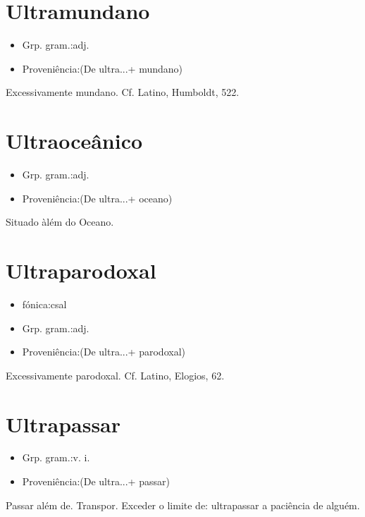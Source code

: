 \documentclass{article}
\begin{document}
\section{Ultramundano}
\begin{itemize}
\item {Grp. gram.:adj.}
\end{itemize}
\begin{itemize}
\item {Proveniência:(De \textunderscore ultra...\textunderscore  + \textunderscore mundano\textunderscore )}
\end{itemize}
Excessivamente mundano. Cf. Latino, \textunderscore Humboldt\textunderscore , 522.
\section{Ultraoceânico}
\begin{itemize}
\item {Grp. gram.:adj.}
\end{itemize}
\begin{itemize}
\item {Proveniência:(De \textunderscore ultra...\textunderscore  + \textunderscore oceano\textunderscore )}
\end{itemize}
Situado àlém do Oceano.
\section{Ultraparodoxal}
\begin{itemize}
\item {fónica:csal}
\end{itemize}
\begin{itemize}
\item {Grp. gram.:adj.}
\end{itemize}
\begin{itemize}
\item {Proveniência:(De \textunderscore ultra...\textunderscore  + \textunderscore parodoxal\textunderscore )}
\end{itemize}
Excessivamente parodoxal. Cf. Latino, \textunderscore Elogios\textunderscore , 62.
\section{Ultrapassar}
\begin{itemize}
\item {Grp. gram.:v. i.}
\end{itemize}
\begin{itemize}
\item {Proveniência:(De \textunderscore ultra...\textunderscore  + \textunderscore passar\textunderscore )}
\end{itemize}
Passar além de.
Transpor.
Exceder o limite de: \textunderscore ultrapassar a paciência de alguém\textunderscore .
\end{document}
